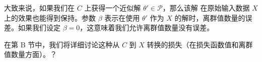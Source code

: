 大致来说，如果我们在 $C$ 上获得一个近似解 $\theta' \in \mathcal{P}$，那么该解
在原始输入数据 $X$ 上的效果也能得到保持。参数 $\beta$ 表示在使用 $\theta'$ 作为 $X$ 的解时，离群值数量的误
差。如果我们设定 $\beta = 0$，这意味着我们允许离群值数量没有误差。

在第 B 节中，我们将详细讨论这种从 $C$ 到 $X$ 转换的损失（在损失函数值和离群值数量方面）。？











